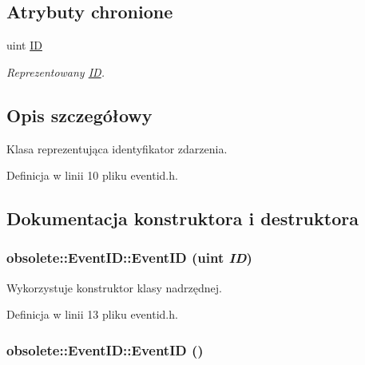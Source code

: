 \subsection*{Atrybuty chronione}
\begin{DoxyCompactItemize}
\item 
uint \hyperlink{classobsolete_1_1AbstractID_a5f67fa1c7d96085f0ef41193b60b570c}{ID}
\begin{DoxyCompactList}\small\item\em Reprezentowany \hyperlink{classobsolete_1_1ID}{ID}. \item\end{DoxyCompactList}\end{DoxyCompactItemize}


\subsection{Opis szczegółowy}
Klasa reprezentująca identyfikator zdarzenia. 

Definicja w linii 10 pliku eventid.h.



\subsection{Dokumentacja konstruktora i destruktora}
\hypertarget{classobsolete_1_1EventID_a56f3f261f5a5a15b298795fe2663e15d}{
\subsubsection[{EventID}]{\setlength{\rightskip}{0pt plus 5cm}obsolete::EventID::EventID (uint {\em ID})}}
\label{classobsolete_1_1EventID_a56f3f261f5a5a15b298795fe2663e15d}


Wykorzystuje konstruktor klasy nadrzędnej. 



Definicja w linii 13 pliku eventid.h.

\hypertarget{classobsolete_1_1EventID_a6de0f2cb209f8a8fe5ebe42a1bb3644d}{
\subsubsection[{EventID}]{\setlength{\rightskip}{0pt plus 5cm}obsolete::EventID::EventID ()}}
\label{classobsolete_1_1EventID_a6de0f2cb209f8a8fe5ebe42a1bb3644d}


